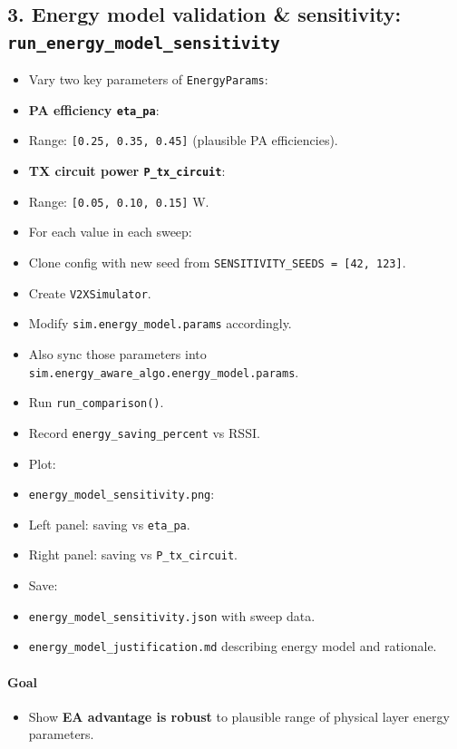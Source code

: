 \documentclass[conference]{IEEEtran}
\begin{document}
\subsection{3. Energy model validation \& sensitivity: \texttt{run_energy_model_sensitivity}}
\begin{itemize}
\item Vary two key parameters of \texttt{EnergyParams}:
\item \textbf{PA efficiency \texttt{eta\_pa}}:
\item Range: \texttt{[0.25, 0.35, 0.45]} (plausible PA efficiencies).
\item \textbf{TX circuit power \texttt{P\_tx\_circuit}}:
\item Range: \texttt{[0.05, 0.10, 0.15]} W.
\item For each value in each sweep:
\item Clone config with new seed from \texttt{SENSITIVITY\_SEEDS = [42, 123]}.
\item Create \texttt{V2XSimulator}.
\item Modify \texttt{sim.energy\_model.params} accordingly.
\item Also sync those parameters into \texttt{sim.energy\_aware\_algo.energy\_model.params}.
\item Run \texttt{run\_comparison()}.
\item Record \texttt{energy\_saving\_percent} vs RSSI.
\item Plot:
\item \texttt{energy\_model\_sensitivity.png}:
\item Left panel: saving vs \texttt{eta\_pa}.
\item Right panel: saving vs \texttt{P\_tx\_circuit}.
\item Save:
\item \texttt{energy\_model\_sensitivity.json} with sweep data.
\item \texttt{energy\_model\_justification.md} describing energy model and rationale.
\end{itemize}

\paragraph*{Goal}
\begin{itemize}
\item Show \textbf{EA advantage is robust} to plausible range of physical layer energy parameters.
\end{itemize}
\end{document}
